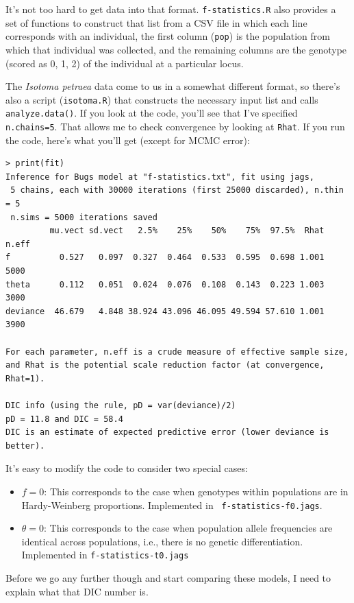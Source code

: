 \documentclass[12pt]{article}
\begin{document}
It's not too hard to get data into that format. {\tt f-statistics.R}
also provides a set of functions to construct that list from a CSV
file in which each line corresponds with an individual, the first
column ({\tt pop}) is the population from which that individual was
collected, and the remaining columns are the genotype (scored as 0, 1,
2) of the individual at a particular locus.

The {\it Isotoma petraea\/} data come to us in a somewhat different
format, so there's also a script ({\tt isotoma.R}) that constructs the
necessary input list and calls {\tt analyze.data()}. If you look at
the code, you'll see that I've specified {\tt n.chains=5}. That allows
me to check convergence by looking at {\tt Rhat}. If you run the code,
here's what you'll get (except for MCMC error):
\begin{verbatim}
> print(fit)
Inference for Bugs model at "f-statistics.txt", fit using jags,
 5 chains, each with 30000 iterations (first 25000 discarded), n.thin = 5
 n.sims = 5000 iterations saved
         mu.vect sd.vect   2.5%    25%    50%    75%  97.5%  Rhat n.eff
f          0.527   0.097  0.327  0.464  0.533  0.595  0.698 1.001  5000
theta      0.112   0.051  0.024  0.076  0.108  0.143  0.223 1.003  3000
deviance  46.679   4.848 38.924 43.096 46.095 49.594 57.610 1.001  3900

For each parameter, n.eff is a crude measure of effective sample size,
and Rhat is the potential scale reduction factor (at convergence, Rhat=1).

DIC info (using the rule, pD = var(deviance)/2)
pD = 11.8 and DIC = 58.4
DIC is an estimate of expected predictive error (lower deviance is better).
\end{verbatim}

It's easy to modify the code to consider two special cases:

\begin{itemize}

\item $f=0$: This corresponds to the case when genotypes within
  populations are in Hardy-Weinberg proportions. Implemented in {\tt
    f-statistics-f0.jags}.

\item $\theta=0$: This corresponds to the case when population allele
  frequencies are identical across populations, i.e., there is no
  genetic differentiation. Implemented in {\tt f-statistics-t0.jags}

\end{itemize}
Before we go any further though and start comparing these models,
I need to explain what that DIC number is.
\end{document}
